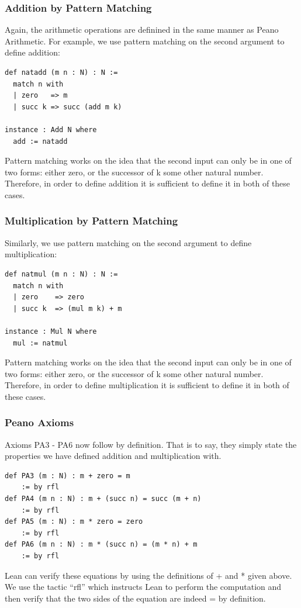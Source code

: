 \documentclass{beamer}
\theoremstyle{indentDefn} \newtheorem{defn}[]{Definition}
\begin{document}
\begin{frame}[fragile]
	\frametitle{Addition by Pattern Matching}
	
	Again, the arithmetic operations are definined in the same manner as Peano Arithmetic. For example, we use pattern matching on the second argument to define addition: 
	
	\begin{lstlisting}
def natadd (m n : N) : N :=
  match n with
  | zero   => m
  | succ k => succ (add m k)

instance : Add N where
  add := natadd		
	\end{lstlisting}
	
	Pattern matching works on the idea that the second input can only be in one of two forms: either zero, or the successor of k some other natural number. Therefore, in order to define addition it is sufficient to define it in both of these cases.

\end{frame}

\begin{frame}[fragile]
	\frametitle{Multiplication by Pattern Matching}
	
	Similarly, we use pattern matching on the second argument to define multiplication: 
	
	\begin{lstlisting}
def natmul (m n : N) : N :=
  match n with
  | zero    => zero
  | succ k  => (mul m k) + m

instance : Mul N where
  mul := natmul	
	\end{lstlisting}
	
	Pattern matching works on the idea that the second input can only be in one of two forms: either zero, or the successor of k some other natural number. Therefore, in order to define multiplication it is sufficient to define it in both of these cases.
\end{frame}

\begin{frame}[fragile]
	\frametitle{Peano Axioms}
	
	Axioms PA3 - PA6 now follow by definition. That is to say, they simply state the properties we have defined addition and multiplication with.	
	\begin{lstlisting}
def PA3 (m : N) : m + zero = m 
	:= by rfl
def PA4 (m n : N) : m + (succ n) = succ (m + n) 
	:= by rfl
def PA5 (m : N) : m * zero = zero 
	:= by rfl
def PA6 (m n : N) : m * (succ n) = (m * n) + m 
	:= by rfl	
	\end{lstlisting}	
	Lean can verify these equations by using the definitions of + and * given above. We use the tactic ``rfl'' which instructs Lean to perform the computation and then verify that the two sides of the equation are indeed = by definition. 	
\end{frame}
\end{document}
